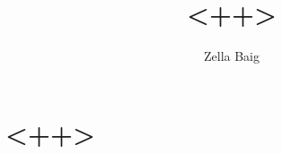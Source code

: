 \documentclass[a4paper]{article}
\title{<++>}
\author{Zella Baig}
\begin{document}
\maketitle
\thispagestyle{empty}
\begin{abstract}
\noindent <++>
\end{abstract}
\newpage
\tableofcontents
\thispagestyle{empty}
\newpage
\setcounter{page}{1}
\section{<++>}
\end{document}
